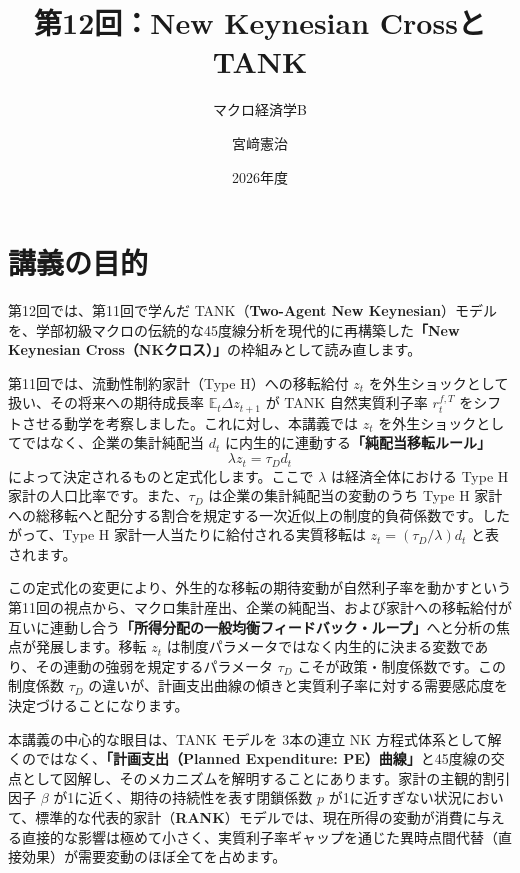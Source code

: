 \documentclass[
  japanese,
  lualatex,
  ja=standard,
  12pt,
  a4paper]{ltjsarticle}
\title{第12回：New Keynesian CrossとTANK}
\subtitle{マクロ経済学B}
\author{宮﨑憲治}
\date{2026年度}
\renewcommand*\contentsname{目次}
\newcommand\contentsname{目次}
\begin{document}
\maketitle

\renewcommand*\contentsname{目次}
{
\setcounter{tocdepth}{3}
\tableofcontents
}


\section{講義の目的}\label{ux8b1bux7fa9ux306eux76eeux7684}

第12回では、第11回で学んだ TANK（\textbf{Two-Agent New
Keynesian}）モデルを、学部初級マクロの伝統的な45度線分析を現代的に再構築した\textbf{「New
Keynesian Cross（NKクロス）」}の枠組みとして読み直します。

第11回では、流動性制約家計（Type H）への移転給付 \(z_t\)
を外生ショックとして扱い、その将来への期待成長率
\(\mathbb{E}_t \Delta z_{t+1}\) が TANK 自然実質利子率 \(r_t^{f,T}\)
をシフトさせる動学を考察しました。これに対し、本講義では \(z_t\)
を外生ショックとしてではなく、企業の集計純配当 \(d_t\)
に内生的に連動する\textbf{「純配当移転ルール」} \[
\lambda z_t = \tau_D d_t
\] によって決定されるものと定式化します。ここで \(\lambda\)
は経済全体における Type H 家計の人口比率です。また、\(\tau_D\)
は企業の集計純配当の変動のうち Type H
家計への総移転へと配分する割合を規定する一次近似上の制度的負荷係数です。したがって、Type
H 家計一人当たりに給付される実質移転は \(z_t = (\tau_D / \lambda) d_t\)
と表されます。

この定式化の変更により、外生的な移転の期待変動が自然利子率を動かすという第11回の視点から、マクロ集計産出、企業の純配当、および家計への移転給付が互いに連動し合う\textbf{「所得分配の一般均衡フィードバック・ループ」}へと分析の焦点が発展します。移転
\(z_t\)
は制度パラメータではなく内生的に決まる変数であり、その連動の強弱を規定するパラメータ
\(\tau_D\) こそが政策・制度係数です。この制度係数 \(\tau_D\)
の違いが、計画支出曲線の傾きと実質利子率に対する需要感応度を決定づけることになります。

本講義の中心的な眼目は、TANK モデルを 3本の連立 NK
方程式体系として解くのではなく、\textbf{「計画支出（Planned Expenditure:
PE）曲線」}と45度線の交点として図解し、そのメカニズムを解明することにあります。家計の主観的割引因子
\(\beta\) が1に近く、期待の持続性を表す閉鎖係数 \(p\)
が1に近すぎない状況において、標準的な代表的家計（\textbf{RANK}）モデルでは、現在所得の変動が消費に与える直接的な影響は極めて小さく、実質利子率ギャップを通じた異時点間代替（直接効果）が需要変動のほぼ全てを占めます。
\end{document}
